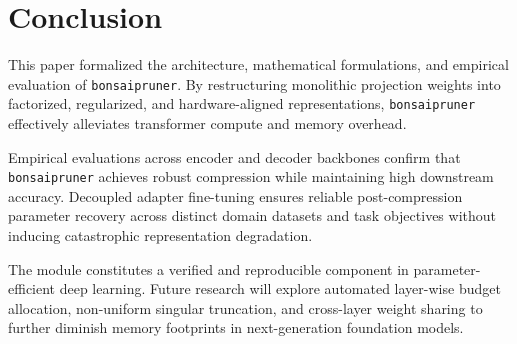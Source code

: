 \section{Conclusion}
This paper formalized the architecture, mathematical formulations, and empirical evaluation of \texttt{bonsaipruner}. By restructuring monolithic projection weights into factorized, regularized, and hardware-aligned representations, \texttt{bonsaipruner} effectively alleviates transformer compute and memory overhead.

Empirical evaluations across encoder and decoder backbones confirm that \texttt{bonsaipruner} achieves robust compression while maintaining high downstream accuracy. Decoupled adapter fine-tuning ensures reliable post-compression parameter recovery across distinct domain datasets and task objectives without inducing catastrophic representation degradation.

The module constitutes a verified and reproducible component in parameter-efficient deep learning. Future research will explore automated layer-wise budget allocation, non-uniform singular truncation, and cross-layer weight sharing to further diminish memory footprints in next-generation foundation models.
